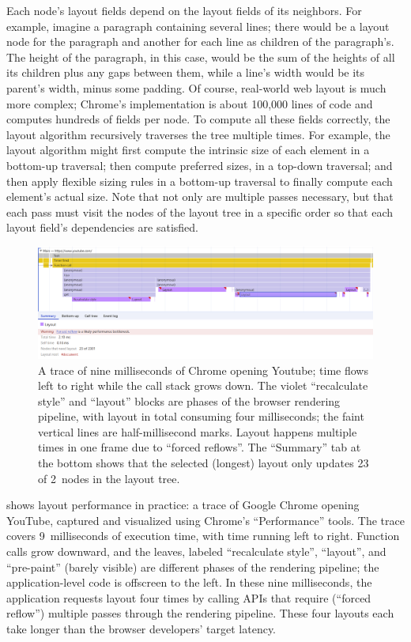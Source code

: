 Each node's layout fields depend on the layout fields
  of its neighbors.
For example, imagine a paragraph containing several lines;
  there would be a layout node for the paragraph
  and another for each line as children of the paragraph's.
The height of the paragraph, in this case,
  would be the sum of the heights of all its children
  plus any gaps between them,
  while a line's width would be its parent's width,
  minus some padding.
Of course, real-world web layout is much more complex;
  Chrome's implementation is about 100,000 lines of code
  and computes hundreds of fields per node.
To compute all these fields correctly, the layout algorithm
  recursively traverses the tree multiple times.
For example, the layout algorithm might first compute
  the intrinsic size of each element in a bottom-up traversal;
  then compute preferred sizes, in a top-down traversal;
  and then apply flexible sizing rules in a bottom-up traversal
  to finally compute each element's actual size.
Note that not only are multiple passes necessary,
  but that each pass must visit the nodes of the layout tree
  in a specific order so that each layout field's dependencies
  are satisfied.

\begin{figure}
    \centering
    \includegraphics[width=\linewidth]{profile.png}
    \caption{
      A trace of nine milliseconds of Chrome opening Youtube;
        time flows left to right while the call stack grows down.
      The violet ``recalculate style'' and ``layout'' blocks
        are phases of the browser rendering pipeline,
        with layout in total consuming four milliseconds;
        the faint vertical lines are half-millisecond marks.
      Layout happens multiple times in one frame
        due to ``forced reflows''.
      The ``Summary'' tab at the bottom shows
        that the selected (longest) layout
        only updates 23 of 2~nodes
        in the layout tree.}
    \label{fig:profile}
\end{figure}

 shows layout performance in practice:
  a trace of Google Chrome opening YouTube,
  captured and visualized using Chrome's ``Performance'' tools.
The trace covers 9~milliseconds of execution time,
  with time running left to right.
Function calls grow downward, and the leaves,
  labeled ``recalculate style'', ``layout'',
  and ``pre-paint'' (barely visible)
  are different phases of the rendering pipeline;
  the application-level code is offscreen to the left.
In these nine milliseconds,
  the application requests layout four times
  by calling APIs that require (``forced reflow'')
  multiple passes through the rendering pipeline.
These four layouts each take longer than
  the browser developers' target latency.

